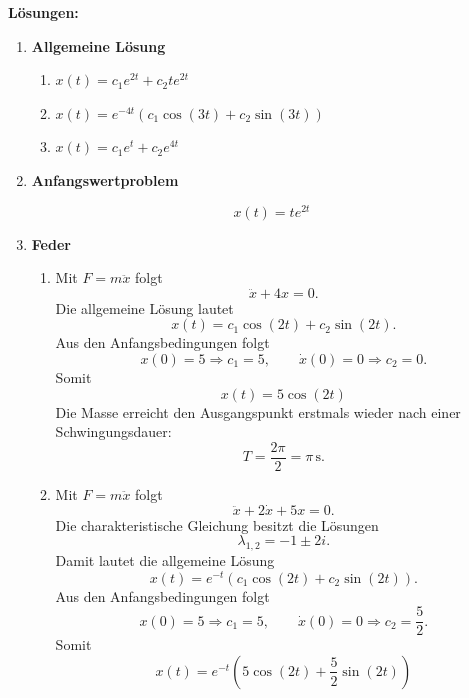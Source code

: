 \clearpage
\textbf{Lösungen:}

\begin{enumerate}
    \item \textbf{Allgemeine Lösung}
          \begin{enumerate}
              \item \(x(t)=c_1e^{2t}+c_2te^{2t}\)

              \item \(x(t)=e^{-4t}\left(c_1\cos(3t)+c_2\sin(3t)\right)\)

              \item \(x(t)=c_1e^t+c_2e^{4t}\)
          \end{enumerate}

    \item \textbf{Anfangswertproblem}

          \[
              x(t)=te^{2t}
          \]

    \item \textbf{Feder}
          \begin{enumerate}
              \item Mit \(F=m\ddot{x}\) folgt
                    \[
                        \ddot{x}+4x=0.
                    \]
                    Die allgemeine Lösung lautet
                    \[
                        x(t)=c_1\cos(2t)+c_2\sin(2t).
                    \]
                    Aus den Anfangsbedingungen folgt
                    \[
                        x(0)=5 \Rightarrow c_1=5,
                        \qquad
                        \dot{x}(0)=0 \Rightarrow c_2=0.
                    \]
                    Somit
                    \[
                        \boxed{x(t)=5\cos(2t)}
                    \]
                    Die Masse erreicht den Ausgangspunkt erstmals wieder
                    nach einer Schwingungsdauer:
                    \[
                        T=\frac{2\pi}{2}=\pi\,\mathrm{s}.
                    \]

              \item Mit \(F=m\ddot{x}\) folgt
                    \[
                        \ddot{x}+2\dot{x}+5x=0.
                    \]
                    Die charakteristische Gleichung besitzt die Lösungen
                    \[
                        \lambda_{1,2}=-1\pm 2i.
                    \]
                    Damit lautet die allgemeine Lösung
                    \[
                        x(t)=e^{-t}
                        \left(c_1\cos(2t)+c_2\sin(2t)\right).
                    \]
                    Aus den Anfangsbedingungen folgt
                    \[
                        x(0)=5 \Rightarrow c_1=5,
                        \qquad
                        \dot{x}(0)=0 \Rightarrow c_2=\frac52.
                    \]
                    Somit
                    \[
                        \boxed{
                            x(t)=e^{-t}
                            \left(5\cos(2t)+\frac52\sin(2t)\right)
                        }
                    \]
          \end{enumerate}


\end{enumerate}
